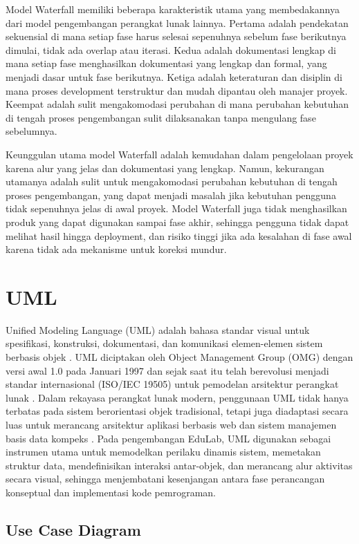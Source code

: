\documentclass[12pt,a4paper,twoside]{report}
\begin{document}
Model Waterfall memiliki beberapa karakteristik utama yang membedakannya dari model pengembangan perangkat lunak lainnya. Pertama adalah pendekatan sekuensial di mana setiap fase harus selesai sepenuhnya sebelum fase berikutnya dimulai, tidak ada overlap atau iterasi. Kedua adalah dokumentasi lengkap di mana setiap fase menghasilkan dokumentasi yang lengkap dan formal, yang menjadi dasar untuk fase berikutnya. Ketiga adalah keteraturan dan disiplin di mana proses development terstruktur dan mudah dipantau oleh manajer proyek. Keempat adalah sulit mengakomodasi perubahan di mana perubahan kebutuhan di tengah proses pengembangan sulit dilaksanakan tanpa mengulang fase sebelumnya.

Keunggulan utama model Waterfall adalah kemudahan dalam pengelolaan proyek karena alur yang jelas dan dokumentasi yang lengkap. Namun, kekurangan utamanya adalah sulit untuk mengakomodasi perubahan kebutuhan di tengah proses pengembangan, yang dapat menjadi masalah jika kebutuhan pengguna tidak sepenuhnya jelas di awal proyek. Model Waterfall juga tidak menghasilkan produk yang dapat digunakan sampai fase akhir, sehingga pengguna tidak dapat melihat hasil hingga deployment, dan risiko tinggi jika ada kesalahan di fase awal karena tidak ada mekanisme untuk koreksi mundur.

\section{UML}

Unified Modeling Language (UML) adalah bahasa standar visual untuk spesifikasi, konstruksi, dokumentasi, dan komunikasi elemen-elemen sistem berbasis objek \cite{booch2005}. UML diciptakan oleh Object Management Group (OMG) dengan versi awal 1.0 pada Januari 1997 dan sejak saat itu telah berevolusi menjadi standar internasional (ISO/IEC 19505) untuk pemodelan arsitektur perangkat lunak \cite{fowler2004}. Dalam rekayasa perangkat lunak modern, penggunaan UML tidak hanya terbatas pada sistem berorientasi objek tradisional, tetapi juga diadaptasi secara luas untuk merancang arsitektur aplikasi berbasis web dan sistem manajemen basis data kompeks \cite{conallen1999}. Pada pengembangan EduLab, UML digunakan sebagai instrumen utama untuk memodelkan perilaku dinamis sistem, memetakan struktur data, mendefinisikan interaksi antar-objek, dan merancang alur aktivitas secara visual, sehingga menjembatani kesenjangan antara fase perancangan konseptual dan implementasi kode pemrograman.

\subsection{Use Case Diagram}
\end{document}
